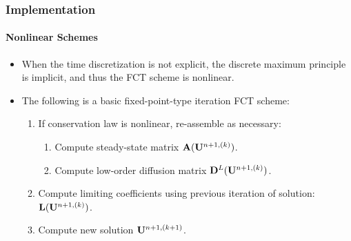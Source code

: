 \documentclass{beamer}
\begin{document}
\begin{frame}
\frametitle{Implementation}
\framesubtitle{Nonlinear Schemes}

\begin{itemize}
   \item When the time discretization is not explicit, the discrete maximum
      principle is implicit, and thus the FCT scheme is nonlinear.
   \item The following is a basic fixed-point-type iteration FCT scheme:
      \begin{enumerate}
         \item If conservation law is nonlinear, re-assemble as necessary:
            \begin{enumerate}
               \item Compute steady-state matrix $\mathbf{A}(\mathbf{U}^{n+1,(k)})$.
               \item Compute low-order diffusion matrix $\mathbf{D}^L(\mathbf{U}^{n+1,(k)})$.
            \end{enumerate}
         \item Compute limiting coefficients using previous iteration of
            solution: $\mathbf{L}(\mathbf{U}^{n+1,(k)})$.
         \item Compute new solution $\mathbf{U}^{n+1,(k+1)}$.
      \end{enumerate}
\end{itemize}

\end{frame}
\end{document}
